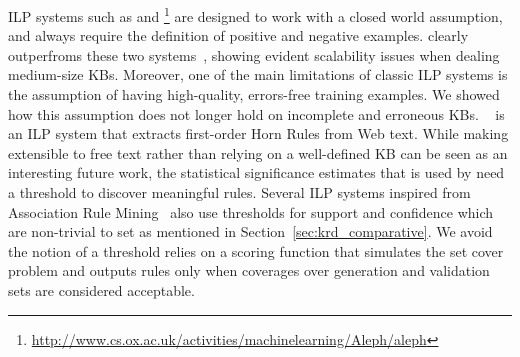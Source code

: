
ILP systems such as  and \footnote{\url{http://www.cs.ox.ac.uk/activities/machinelearning/Aleph/aleph}} are designed to work with a closed world assumption, 
and always require the definition of positive and negative examples. \amie clearly outperfroms these two systems~\cite{galarraga2015fast}, showing evident scalability issues 
when dealing medium-size KBs. Moreover, one of the main limitations of classic ILP systems is the assumption of having high-quality, errors-free training examples. 
We showed how this assumption does not longer hold on incomplete and erroneous KBs. ~\cite{schoenmackers2010learning} is an ILP system that extracts first-order Horn Rules 
from Web text. While making \krd extensible to free text rather than relying on a well-defined KB can be seen as an interesting future work, 
the statistical significance estimates that is used by 
 need a threshold to discover meaningful rules. Several ILP systems inspired from Association Rule Mining~\cite{agrawal1993mining} also use thresholds for 
support and confidence which are non-trivial to set as mentioned in Section~\ref{sec:krd_comparative}. We avoid the notion of a threshold \krd relies on a scoring function that simulates the set cover problem and outputs rules only when coverages over generation and validation sets are considered acceptable.


